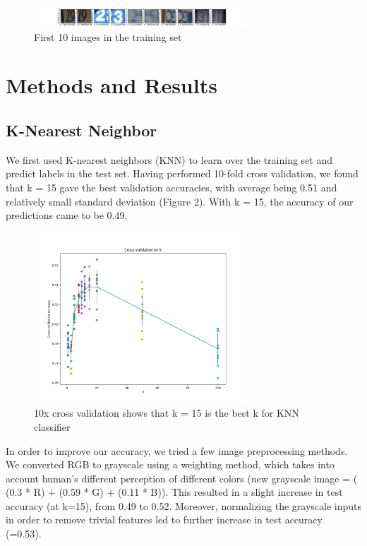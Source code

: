 \documentclass[12pt]{article}
\begin{document}
\begin{figure}[!tpb]
	\centerline{\includegraphics[width=80mm]{train_first10.png}}
	\caption{\label{Figure 1}
		First 10 images in the training set}
\end{figure}

\hrulefill

\section{Methods and Results}
\subsection{K-Nearest Neighbor}
\indent \indent We first used K-nearest neighbors (KNN) to learn over the training set and predict labels in the test set. Having performed 10-fold cross validation, we found that k = 15 gave the best validation accuracies, with average being 0.51 and relatively small standard deviation (Figure 2). With k = 15, the accuracy of our predictions came to be 0.49.

\begin{figure}[!tpb]
	\centerline{\includegraphics[width=80mm]{knn.png}}
	\caption{\label{Figure 2}
		10x cross validation shows that k = 15 is the best k for KNN classifier}
\end{figure}

\indent \indent In order to improve our accuracy, we tried a few image preprocessing methods. 
We converted RGB to grayscale using a weighting method, which takes into account human's different perception of different colors (new grayscale image = ( (0.3 * R) + (0.59 * G) + (0.11 * B)). This resulted in a slight increase in test accuracy (at k=15), from 0.49 to 0.52. Moreover, normalizing the grayscale inputs in order to remove trivial features led to further increase in test accuracy (=0.53).
\end{document}
